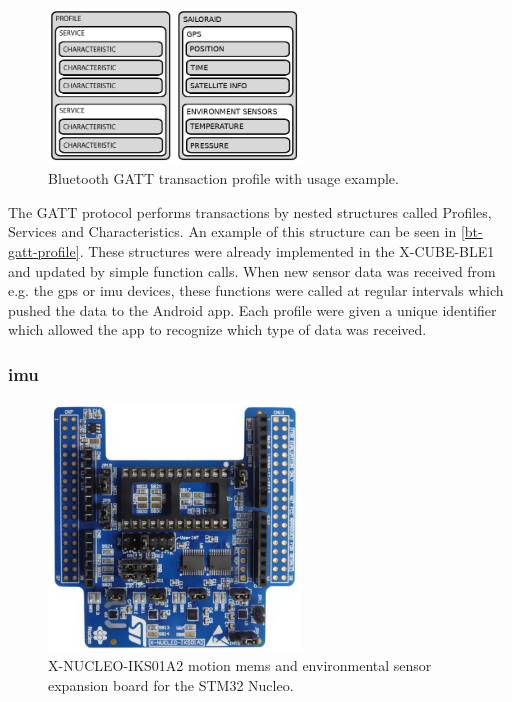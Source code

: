 \begin{figure}[H]
\centering
\includegraphics[width=0.6\textwidth]{Figures/bt_gatt_profile.png}
\caption{Bluetooth GATT transaction profile with usage example.}
\label{bt-gatt-profile}
\end{figure}

The GATT protocol performs transactions by nested structures called Profiles, Services and Characteristics. An example of this structure can be seen in \autoref{bt-gatt-profile}. These structures were already implemented in the X-CUBE-BLE1 and updated by simple function calls. When new sensor data was received from e.g. the \gls{gps} or \gls{imu} devices, these functions were called at regular intervals which pushed the data to the Android app. Each profile were given a unique identifier which allowed the app to recognize which type of data was received.

\subsubsection{\gls{imu}}

\begin{figure}[H]
\centering
\includegraphics[width=0.6\textwidth]{Figures/x-nucleo-iks01a2.jpg}
\caption{X-NUCLEO-IKS01A2 motion \gls{mems} and environmental sensor expansion board for the STM32 Nucleo.}
\label{imu-eval-board}
\end{figure}


